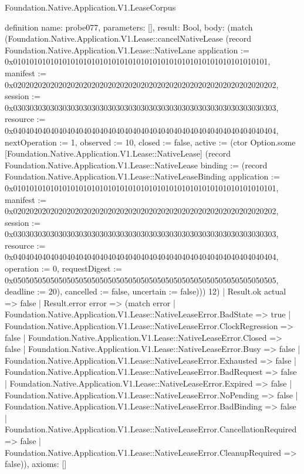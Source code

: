 \begin{lexlean}{Foundation.Native.Application.V1.LeaseCorpus}
\begin{semanticmodule}
definition{
  name: probe077,
  parameters: [],
  result: Bool,
  body: (match (Foundation.Native.Application.V1.Lease::cancelNativeLease (record Foundation.Native.Application.V1.Lease::NativeLane {application := 0x01010101010101010101010101010101010101010101010101010101010101, manifest := 0x0202020202020202020202020202020202020202020202020202020202020202, session := 0x0303030303030303030303030303030303030303030303030303030303030303, resource := 0x0404040404040404040404040404040404040404040404040404040404040404, nextOperation := 1, observed := 10, closed := false, active := (ctor Option.some [Foundation.Native.Application.V1.Lease::NativeLease] (record Foundation.Native.Application.V1.Lease::NativeLease {binding := (record Foundation.Native.Application.V1.Lease::NativeLeaseBinding {application := 0x0101010101010101010101010101010101010101010101010101010101010101, manifest := 0x0202020202020202020202020202020202020202020202020202020202020202, session := 0x0303030303030303030303030303030303030303030303030303030303030303, resource := 0x0404040404040404040404040404040404040404040404040404040404040404, operation := 0, requestDigest := 0x0505050505050505050505050505050505050505050505050505050505050505, deadline := 20}), cancelled := false, uncertain := false}))}) 12)
    | Result.ok actual => false
    | Result.error error => (match error
      | Foundation.Native.Application.V1.Lease::NativeLeaseError.BadState => true
      | Foundation.Native.Application.V1.Lease::NativeLeaseError.ClockRegression => false
      | Foundation.Native.Application.V1.Lease::NativeLeaseError.Closed => false
      | Foundation.Native.Application.V1.Lease::NativeLeaseError.Busy => false
      | Foundation.Native.Application.V1.Lease::NativeLeaseError.Exhausted => false
      | Foundation.Native.Application.V1.Lease::NativeLeaseError.BadRequest => false
      | Foundation.Native.Application.V1.Lease::NativeLeaseError.Expired => false
      | Foundation.Native.Application.V1.Lease::NativeLeaseError.NoPending => false
      | Foundation.Native.Application.V1.Lease::NativeLeaseError.BadBinding => false
      | Foundation.Native.Application.V1.Lease::NativeLeaseError.CancellationRequired => false
      | Foundation.Native.Application.V1.Lease::NativeLeaseError.CleanupRequired => false)),
  axioms: []
}


\end{semanticmodule}
\end{lexlean}
